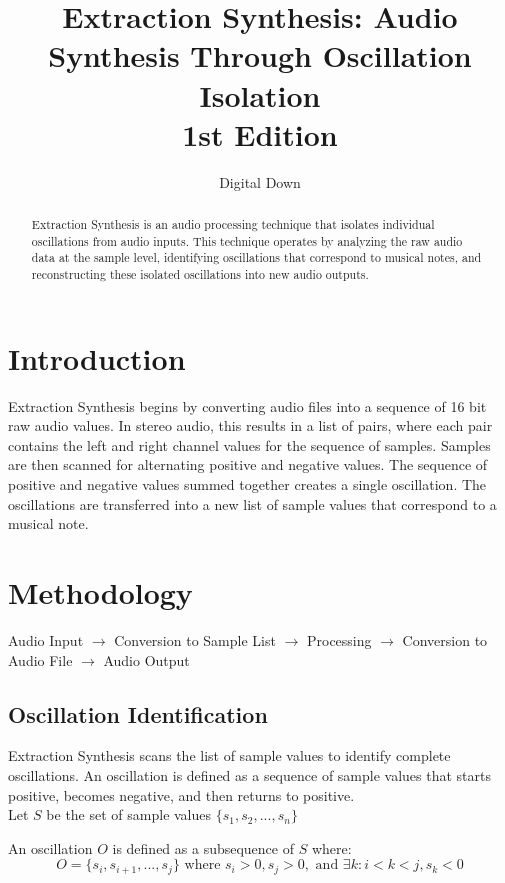 \documentclass[12pt,a4paper]{article}
\title{Extraction Synthesis: Audio Synthesis Through Oscillation Isolation\\
\small{1st Edition}}
\author{Digital Down}
\begin{document}
\maketitle

\begin{abstract}
Extraction Synthesis is an audio processing technique that isolates individual oscillations from audio inputs. This technique operates by analyzing the raw audio data at the sample level, identifying oscillations that correspond to musical notes, and reconstructing these isolated oscillations into new audio outputs.
\end{abstract}

\section{Introduction}
Extraction Synthesis begins by converting audio files into a sequence of 16 bit raw audio values. In stereo audio, this results in a list of pairs, where each pair contains the left and right channel values for the sequence of samples. Samples are then scanned for alternating positive and negative values. The sequence of positive and negative values summed together creates a single oscillation. The oscillations are transferred into a new list of sample values that correspond to a musical note.

\section{Methodology}
\begin{center}
Audio Input $\rightarrow$ Conversion to Sample List $\rightarrow$ Processing $\rightarrow$ Conversion to Audio File $\rightarrow$ Audio Output
\end{center}

\subsection{Oscillation Identification}
Extraction Synthesis scans the list of sample values to identify complete oscillations. An oscillation is defined as a sequence of sample values that starts positive, becomes negative, and then returns to positive.\\

Let $S$ be the set of sample values $\{s_1, s_2, ..., s_n\}$

An oscillation $O$ is defined as a subsequence of $S$ where:
\begin{equation*}
O = \{s_i, s_{i+1}, ..., s_j\} \text { where } s_i > 0, s_j > 0, \text { and } \exists k : i < k < j, s_k < 0
\end{equation*}
\end{document}
